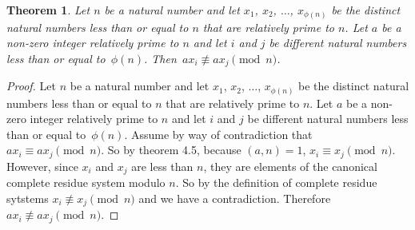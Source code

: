\documentclass[12pt,leqno]{article}
\numberwithin{equation}{section}
\newtheorem{thm}{Theorem}[section]
\theoremstyle{definition}
\begin{document}
\begin{thm}
Let $n$ be a natural number and let $x_1$, $x_2$, $\hdots$,
$x_{\phi(n)}$ be the distinct natural numbers less than or equal to
$n$ that are relatively prime to $n$.  Let $a$ be a non-zero integer
relatively prime to $n$ and let $i$ and $j$ be different natural
numbers less than or equal to~$\phi(n)$.  Then~$ax_i \not \equiv
ax_j \pmod{n}$.
\end{thm}
\begin{proof}[Proof]
Let $n$ be a natural number and let $x_1$, $x_2$, $\hdots$, $x_{\phi(n)}$ be the distinct natural numbers less than or equal to $n$ that are relatively prime to $n$.  Let $a$ be a non-zero integer relatively prime to $n$ and let $i$ and $j$ be different natural numbers less than or equal to~$\phi(n)$.  Assume by way of contradiction that $ax_i \equiv ax_j \pmod{n}$.  So by theorem 4.5, because $(a, n) = 1$, $x_i \equiv x_j \pmod{n}$.  However, since $x_i$ and $x_j$ are less than $n$, they are elements of the canonical complete residue system modulo $n$.  So by the definition of complete residue sytstems $x_i \not \equiv x_j \pmod{n}$ and we have a contradiction.  Therefore $ax_i \not \equiv ax_j \pmod{n}$.
\end{proof}
\end{document}
